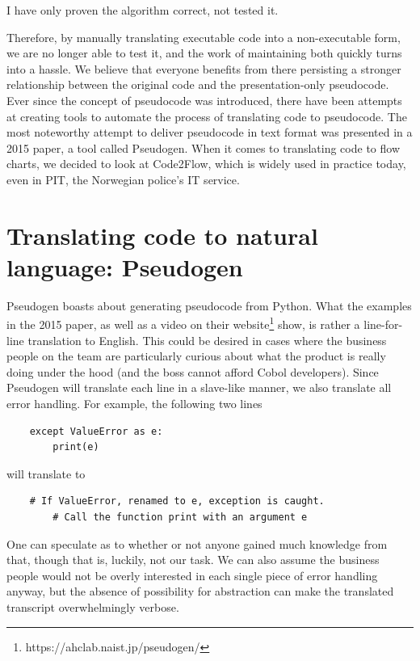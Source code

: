 \begin{displayquote}
    I have only proven the algorithm correct, not tested it.\cite{DBLP:books/aw/Knuth68}
\end{displayquote}

Therefore, by manually translating executable code into a non-executable form, we are no longer able to test it, and the work of maintaining both quickly turns into a hassle. We believe that everyone benefits from there persisting a stronger relationship between the original code and the presentation-only pseudocode. \hfill \\

Ever since the concept of pseudocode was introduced, there have been attempts at creating tools to automate the process of translating code to pseudocode. The most noteworthy attempt to deliver pseudocode in text format was presented in a 2015 paper, a tool called Pseudogen. When it comes to translating code to flow charts, we decided to look at Code2Flow, which is widely used in practice today, even in PIT, the Norwegian police's IT service. \hfill \\

\section{Translating code to natural language: Pseudogen}

Pseudogen boasts about generating pseudocode from Python. What the examples in the 2015 paper, as well as a video on their website\footnote{https://ahclab.naist.jp/pseudogen/} show, is rather a line-for-line translation to English. This could be desired in cases where the business people on the team are particularly curious about what the product is really doing under the hood (and the boss cannot afford Cobol developers). Since Pseudogen will translate each line in a slave-like manner, we also translate all error handling. For example, the following two lines

\begin{verbatim}
    except ValueError as e:
        print(e)
\end{verbatim}

will translate to

\begin{verbatim}
    # If ValueError, renamed to e, exception is caught.
        # Call the function print with an argument e
\end{verbatim}

One can speculate as to whether or not anyone gained much knowledge from that, though that is, luckily, not our task. We can also assume the business people would not be overly interested in each single piece of error handling anyway, but the absence of possibility for abstraction can make the translated transcript overwhelmingly verbose. \hfill \\

